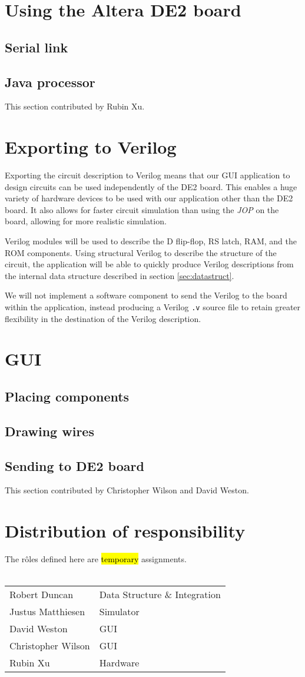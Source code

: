 \documentclass[12pt, a4paper, oneside,titlepage]{article}
\begin{document}
\section{Using the Altera DE2 board}
\subsection{Serial link}
\subsection{Java processor}
This section contributed by Rubin Xu.



\section{Exporting to Verilog}
Exporting the circuit description to Verilog means that our GUI application to design circuits can be used independently of the DE2 board. This enables a huge variety of hardware devices to be used with our application other than the DE2 board. It also allows for faster circuit simulation than using the \emph{JOP} on the board, allowing for more realistic simulation. 

Verilog modules will be used to describe the D flip-flop, RS latch, RAM, and the ROM components. Using structural Verilog to describe the structure of the circuit, the application will be able to quickly produce Verilog descriptions from the internal data structure described in section \ref{sec:datastruct}.

We will not implement a software component to send the Verilog to the board within the application, instead producing a Verilog \texttt{.v} source file to retain greater flexibility in the destination of the Verilog description. 

\section{GUI}
\subsection{Placing components}
\subsection{Drawing wires}
\subsection{Sending to DE2 board}
This section contributed by Christopher Wilson and David Weston.

\section{Distribution of responsibility}
The r\^oles defined here are \hl{temporary} assignments. \\ \\ 
\begin{tabular}{l l}
Robert Duncan & Data Structure \& Integration\\ 
Justus Matthiesen & Simulator \\
David Weston & GUI \\
Christopher Wilson & GUI \\
Rubin Xu & Hardware \\
\end{tabular}
\end{document}
